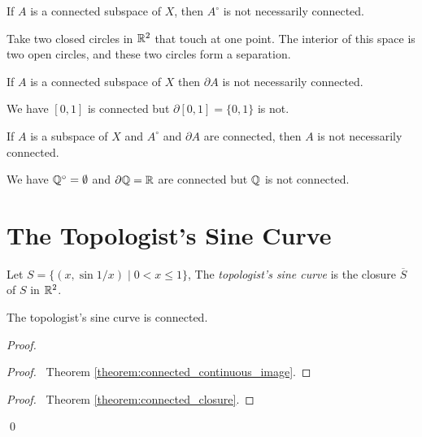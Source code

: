 \begin{example}
    If $A$ is a connected subspace of $X$, then $A^\circ$ is not necessarily connected.

    Take two closed circles in $\mathbb{R}^2$ that touch at one point. The interior of this space is
    two open circles, and these two circles form a separation.
\end{example}

\begin{example}
    If $A$ is a connected subspace of $X$ then $\partial A$ is not necessarily connected.

    We have $[0,1]$ is connected but $\partial [0,1] = \{ 0, 1 \}$ is not.
\end{example}

\begin{example}
    If $A$ is a subspace of $X$ and $A^\circ$ and $\partial A$ are connected, then $A$ is not necessarily connected.

    We have $\mathbb{Q}^\circ = \emptyset$ and $\partial \mathbb{Q} = \mathbb{R}$ are connected but $\mathbb{Q}$ is not connected.
\end{example}

\section{The Topologist's Sine Curve}

\begin{definition}
    Let $S = \{ (x, \sin 1/x) \mid 0 < x \leq 1 \}$, The \emph{topologist's sine curve} is the closure $\overline{S}$ of $S$ in $\mathbb{R}^2$.
\end{definition}

\begin{proposition}
    The topologist's sine curve is connected.
\end{proposition}

\begin{proof}
    \pf
    \begin{proof}
        \pf\ Theorem \ref{theorem:connected_continuous_image}.
    \end{proof}
    \begin{proof}
        \pf\ Theorem \ref{theorem:connected_closure}.
    \end{proof}
    \qed
\end{proof}

